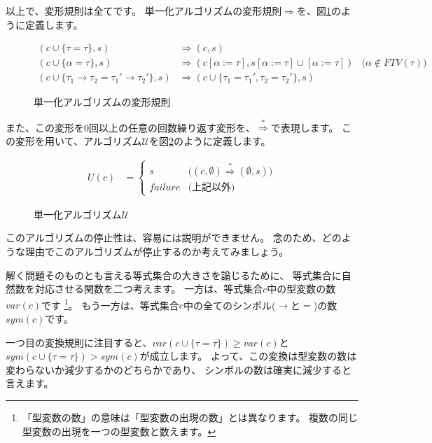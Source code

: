 以上で、変形規則は全てです。
単一化アルゴリズムの変形規則$\Longrightarrow$を、図\ref{fig:unification-trans}のように定義します。

\begin{figure}[htbp]
  \begin{align*}
    (c \cup \{\tau = \tau\}, s)
      &\Longrightarrow (c, s) \\
    (c \cup \{\alpha = \tau\}, s)
      &\Longrightarrow (c[\alpha := \tau], s[\alpha := \tau] \cup [\alpha := \tau])
      &\text{($\alpha \notin \mathit{FTV(\tau)}$)}\\
    (c \cup \{\tau_1 \to \tau_2 = \tau_1' \to \tau_2'\}, s)
      &\Longrightarrow (c \cup \{\tau_1 = \tau_1', \tau_2 = \tau_2'\}, s)
  \end{align*}
  \caption{単一化アルゴリズムの変形規則}
  \label{fig:unification-trans}
\end{figure}

また、この変形を0回以上の任意の回数繰り返す変形を、$\stackrel{*}{\Longrightarrow}$で表現します。
この変形を用いて、アルゴリズム$\mathcal U$を図\ref{fig:algorithm-u}のように定義します。

\begin{figure}[htbp]
  \begin{align*}
    U(c) &=
    \begin{cases}
      s & \text{($(c, \emptyset) \stackrel{*}{\Longrightarrow} (\emptyset, s)$)} \\
      \mathit{failure} & \text{(上記以外)}
    \end{cases}
  \end{align*}
  \caption{単一化アルゴリズム$\mathcal U$}
  \label{fig:algorithm-u}
\end{figure}

このアルゴリズムの停止性は、容易には説明ができません。
念のため、どのような理由でこのアルゴリズムが停止するのか考えてみましょう。

解く問題そのものとも言える等式集合の大きさを論じるために、
等式集合に自然数を対応させる関数を二つ考えます。
一方は、等式集合$c$中の型変数の数$\mathit{var}(c)$です
\footnote{「型変数の数」の意味は「型変数の出現の数」とは異なります。
複数の同じ型変数の出現を一つの型変数と数えます。}。
もう一方は、等式集合$c$中の全てのシンボル($\to$と$=$)の数$\mathit{sym}(c)$です。

一つ目の変換規則に注目すると、$\mathit{var}(c \cup \{\tau = \tau\}) \ge \mathit{var}(c)$と
$\mathit{sym}(c \cup \{\tau = \tau\}) > \mathit{sym}(c)$が成立します。
よって、この変換は型変数の数は変わらないか減少するかのどちらかであり、
シンボルの数は確実に減少すると言えます。

